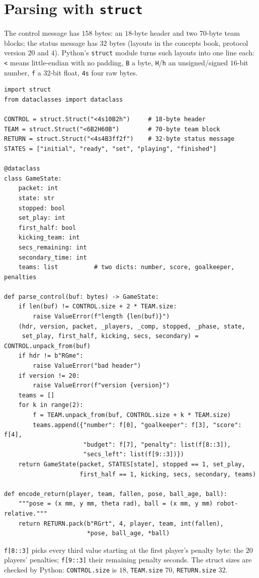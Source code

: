 \section*{Parsing with \texttt{struct}}
The control message has $158$ bytes: an $18$-byte header and two $70$-byte team blocks; the status message has $32$ bytes (layouts in the concepts book, protocol version $20$ and $4$). Python's \texttt{struct} module turns such layouts into one line each: \texttt{<} means little-endian with no padding, \texttt{B} a byte, \texttt{H}/\texttt{h} an unsigned/signed $16$-bit number, \texttt{f} a $32$-bit float, \texttt{4s} four raw bytes.
\begin{verbatim}
import struct
from dataclasses import dataclass

CONTROL = struct.Struct("<4s10B2h")     # 18-byte header
TEAM = struct.Struct("<6B2H60B")        # 70-byte team block
RETURN = struct.Struct("<4s4B3ff2f")    # 32-byte status message
STATES = ["initial", "ready", "set", "playing", "finished"]

@dataclass
class GameState:
    packet: int
    state: str
    stopped: bool
    set_play: int
    first_half: bool
    kicking_team: int
    secs_remaining: int
    secondary_time: int
    teams: list          # two dicts: number, score, goalkeeper, penalties

def parse_control(buf: bytes) -> GameState:
    if len(buf) != CONTROL.size + 2 * TEAM.size:
        raise ValueError(f"length {len(buf)}")
    (hdr, version, packet, _players, _comp, stopped, _phase, state,
     set_play, first_half, kicking, secs, secondary) = CONTROL.unpack_from(buf)
    if hdr != b"RGme":
        raise ValueError("bad header")
    if version != 20:
        raise ValueError(f"version {version}")
    teams = []
    for k in range(2):
        f = TEAM.unpack_from(buf, CONTROL.size + k * TEAM.size)
        teams.append({"number": f[0], "goalkeeper": f[3], "score": f[4],
                      "budget": f[7], "penalty": list(f[8::3]),
                      "secs_left": list(f[9::3])})
    return GameState(packet, STATES[state], stopped == 1, set_play,
                     first_half == 1, kicking, secs, secondary, teams)

def encode_return(player, team, fallen, pose, ball_age, ball):
    """pose = (x mm, y mm, theta rad), ball = (x mm, y mm) robot-relative."""
    return RETURN.pack(b"RGrt", 4, player, team, int(fallen),
                       *pose, ball_age, *ball)
\end{verbatim}
\verb!f[8::3]! picks every third value starting at the first player's penalty byte: the $20$ players' penalties; \verb!f[9::3]! their remaining penalty seconds. The struct sizes are checked by Python: \texttt{CONTROL.size} is $18$, \texttt{TEAM.size} $70$, \texttt{RETURN.size} $32$.

